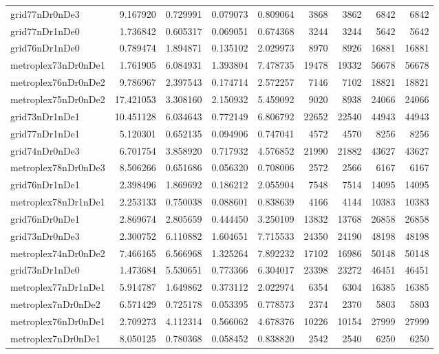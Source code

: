 \begin{longtable}{|l|r|r|r|r|r|r|r|r|}
grid77nDr0nDe3 & 9.167920 & 0.729991 & 0.079073 & 0.809064 & 3868 & 3862 & 6842 & 6842 \\
grid77nDr1nDe0 & 1.736842 & 0.605317 & 0.069051 & 0.674368 & 3244 & 3244 & 5642 & 5642 \\
grid76nDr1nDe0 & 0.789474 & 1.894871 & 0.135102 & 2.029973 & 8970 & 8926 & 16881 & 16881 \\
metroplex73nDr0nDe1 & 1.761905 & 6.084931 & 1.393804 & 7.478735 & 19478 & 19332 & 56678 & 56678 \\
metroplex76nDr0nDe2 & 9.786967 & 2.397543 & 0.174714 & 2.572257 & 7146 & 7102 & 18821 & 18821 \\
metroplex75nDr0nDe2 & 17.421053 & 3.308160 & 2.150932 & 5.459092 & 9020 & 8938 & 24066 & 24066 \\
grid73nDr1nDe1 & 10.451128 & 6.034643 & 0.772149 & 6.806792 & 22652 & 22540 & 44943 & 44943 \\
grid77nDr1nDe1 & 5.120301 & 0.652135 & 0.094906 & 0.747041 & 4572 & 4570 & 8256 & 8256 \\
grid74nDr0nDe3 & 6.701754 & 3.858920 & 0.717932 & 4.576852 & 21990 & 21882 & 43627 & 43627 \\
metroplex78nDr0nDe3 & 8.506266 & 0.651686 & 0.056320 & 0.708006 & 2572 & 2566 & 6167 & 6167 \\
grid76nDr1nDe1 & 2.398496 & 1.869692 & 0.186212 & 2.055904 & 7548 & 7514 & 14095 & 14095 \\
metroplex78nDr1nDe1 & 2.253133 & 0.750038 & 0.088601 & 0.838639 & 4166 & 4144 & 10383 & 10383 \\
grid76nDr0nDe1 & 2.869674 & 2.805659 & 0.444450 & 3.250109 & 13832 & 13768 & 26858 & 26858 \\
grid73nDr0nDe3 & 2.300752 & 6.110882 & 1.604651 & 7.715533 & 24350 & 24190 & 48198 & 48198 \\
metroplex74nDr0nDe2 & 7.466165 & 6.566968 & 1.325264 & 7.892232 & 17102 & 16986 & 50148 & 50148 \\
grid73nDr1nDe0 & 1.473684 & 5.530651 & 0.773366 & 6.304017 & 23398 & 23272 & 46451 & 46451 \\
metroplex77nDr1nDe1 & 5.914787 & 1.649862 & 0.373112 & 2.022974 & 6354 & 6304 & 16385 & 16385 \\
metroplex7nDr0nDe2 & 6.571429 & 0.725178 & 0.053395 & 0.778573 & 2374 & 2370 & 5803 & 5803 \\
metroplex76nDr0nDe1 & 2.709273 & 4.112314 & 0.566062 & 4.678376 & 10226 & 10154 & 27999 & 27999 \\
metroplex7nDr0nDe1 & 8.050125 & 0.780368 & 0.058452 & 0.838820 & 2542 & 2540 & 6250 & 6250 \\

\end{longtable}
